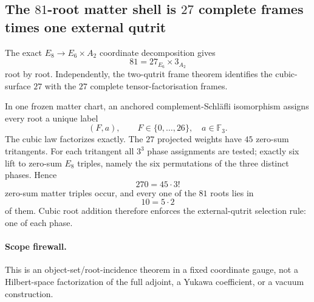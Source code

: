 \subsection*{The $81$-root matter shell is $27$ complete frames times one external qutrit}

The exact $E_8\to E_6\times A_2$ coordinate decomposition gives
\[
81=27_{E_6}\times3_{A_2}
\]
root by root. Independently, the two-qutrit frame theorem identifies the cubic-surface $27$ with the $27$ complete tensor-factorisation frames.

In one frozen matter chart, an anchored complement-Schl\"afli isomorphism assigns every root a unique label
\[
\boxed{(F,a),\qquad F\in\{0,\ldots,26\},\quad a\in\mathbb F_3.}
\]
The cubic law factorizes exactly. The $27$ projected weights have $45$ zero-sum tritangents. For each tritangent all $3^3$ phase assignments are tested; exactly six lift to zero-sum $E_8$ triples, namely the six permutations of the three distinct phases. Hence
\[
\boxed{270=45\cdot3!}
\]
zero-sum matter triples occur, and every one of the $81$ roots lies in
\[
\boxed{10=5\cdot2}
\]
of them. Cubic root addition therefore enforces the external-qutrit selection rule: one of each phase.

\paragraph{Scope firewall.}
This is an object-set/root-incidence theorem in a fixed coordinate gauge, not a Hilbert-space factorization of the full adjoint, a Yukawa coefficient, or a vacuum construction.
